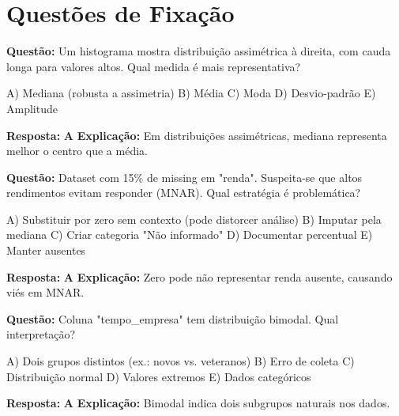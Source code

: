 \section*{Questões de Fixação}

\begin{SolvedBox}[title=Questão de Fixação 1 - Histogramas e Distribuições]
\textbf{Questão:} Um histograma mostra distribuição assimétrica à direita, com cauda longa para valores altos. Qual medida é mais representativa?

A) Mediana (robusta a assimetria)  
B) Média  
C) Moda  
D) Desvio-padrão  
E) Amplitude

\textbf{Resposta:} \textbf{A}  
\textbf{Explicação:} Em distribuições assimétricas, mediana representa melhor o centro que a média.
\end{SolvedBox}

\begin{SolvedBox}[title=Questão de Fixação 2 - Dados Ausentes]
\textbf{Questão:} Dataset com 15\% de missing em "renda". Suspeita-se que altos rendimentos evitam responder (MNAR). Qual estratégia é problemática?

A) Substituir por zero sem contexto (pode distorcer análise)  
B) Imputar pela mediana  
C) Criar categoria "Não informado"  
D) Documentar percentual  
E) Manter ausentes

\textbf{Resposta:} \textbf{A}  
\textbf{Explicação:} Zero pode não representar renda ausente, causando viés em MNAR.
\end{SolvedBox}

\begin{SolvedBox}[title=Questão de Fixação 3 - Distribuições e Missing]
\textbf{Questão:} Coluna "tempo_empresa" tem distribuição bimodal. Qual interpretação?

A) Dois grupos distintos (ex.: novos vs. veteranos)  
B) Erro de coleta  
C) Distribuição normal  
D) Valores extremos  
E) Dados categóricos

\textbf{Resposta:} \textbf{A}  
\textbf{Explicação:} Bimodal indica dois subgrupos naturais nos dados.
\end{SolvedBox}
